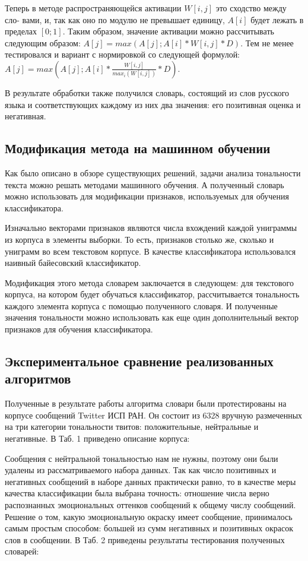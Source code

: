 Теперь в методе распространяющейся активации $W[i, j]$ это сходство между сло-
вами, и, так как оно по модулю не превышает единицу, $A[i]$ будет лежать в пределах
$[0;1]$. Таким образом, значение активации можно рассчитывать следующим образом:
$A[j] = max(A[j]; A[i] * W[i, j] * D)$. Тем не менее тестировался и вариант с нормировкой
со следующей формулой: $A[j] = max(A[j]; A[i] * \frac{W[i,j]}{max_i(W[i,j])} * D)$.

В результате обработки также получился словарь, состоящий из слов русского
языка и соответствующих каждому из них два значения: его позитивная оценка и
негативная.

\subsection{Модификация метода на машинном обучении}
Как было описано в обзоре существующих решений, задачи анализа тональности
текста можно решать методами машинного обучения. А полученный словарь можно
использовать для модификации признаков, используемых для обучения
классификатора.

Изначально векторами признаков являются числа вхождений каждой униграммы из
корпуса в элементы выборки. То есть, признаков столько же, сколько и униграмм во
всем текстовом корпусе. В качестве классификатора использовался наивный
байесовский классификатор.

Модификация этого метода словарем заключается в следующем: для текстового
корпуса, на котором будет обучаться классификатор, рассчитывается тональность
каждого элемента корпуса с помощью полученного словаря. И полученные значения
тональности можно использовать как еще один дополнительный вектор признаков
для обучения классификатора.

\subsection{Экспериментальное сравнение реализованных алгоритмов}
Полученные в результате работы алгоритма словари были протестированы на
корпусе сообщений Twitter ИСП РАН. Он состоит из 6328 вручную размеченных на
три категории тональности твитов: положительные, нейтральные и негативные. В
Таб. 1 приведено описание корпуса:


Сообщения с нейтральной тональностью нам не нужны, поэтому они были удалены из
рассматриваемого набора данных. Так как число позитивных и негативных сообщений
в наборе данных практически равно, то в качестве меры качества
классификации была выбрана точность: отношение числа верно распознанных
эмоциональных оттенков сообщений к общему числу сообщений. Решение о том, какую
эмоциональную окраску имеет сообщение, принималось самым простым способом:
большей из сумм негативных и позитивных окрасок слов в сообщении. В Таб. 2
приведены результаты тестирования полученных словарей:

